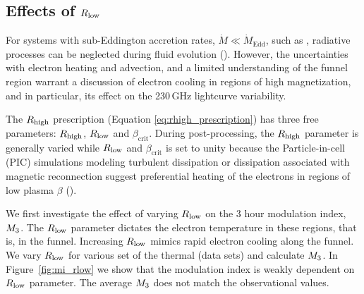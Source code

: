%
\subsection{Effects of \texorpdfstring{$R_\mathrm{low}$}{Rl} } %

For systems with sub-Eddington accretion rates, $\Dot{M}\ll\Dot{M}_\mathrm{Edd}$, such as \sgra, radiative processes can be neglected during fluid evolution (\citealt{2012MNRAS.426.1928D, 10.1093/mnras/stw3116, Ryan_2017}).
However, the uncertainties with electron heating and advection, and a limited understanding of the funnel region warrant a discussion of electron cooling in regions of high magnetization, and in particular, its effect on the 230\,GHz lightcurve variability.

The $R_\mathrm{high}$ prescription (Equation \ref{eq:rhigh_prescription}) has three free parameters: $R_\mathrm{high}$, $R_\mathrm{low}$ and $\beta_\mathrm{crit}$. During post-processing, the $R_\mathrm{high}$ parameter is generally varied while $R_\mathrm{low}$ and $\beta_\mathrm{crit}$ is set to unity because the Particle-in-cell (PIC) simulations modeling turbulent dissipation or dissipation associated with magnetic reconnection suggest preferential heating of the electrons in regions of low plasma $\beta$ (\citealt{2010MNRAS.409L.104H, Rowan_2017, 10.1093/mnras/stx2530, Rowan_2019, Kawazura771, PhysRevX.10.041050, kawazura2021energy}).

We first investigate the effect of varying $R_\mathrm{low}$ on the 3 hour modulation index, $M_{3}$. The $R_\mathrm{low}$ parameter dictates the electron temperature in these regions, that is, in the funnel. Increasing $R_\mathrm{low}$ mimics rapid electron cooling along the funnel.
We vary $R_\mathrm{low}$ for various set of the thermal (\kharma data sets) and calculate $M_{3}$. In Figure~\ref{fig:mi_rlow} we show that the modulation index is weakly dependent on $R_\mathrm{low}$ parameter.
The average $M_{3}$ does not match the observational values.


